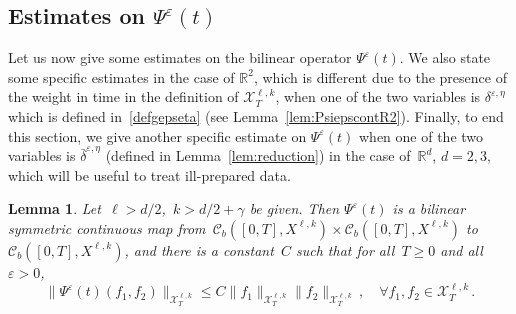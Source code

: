 \documentclass[11pt]{article}
\newtheorem{lemm}[theo]{Lemma}
\theoremstyle{definition}
\numberwithin{equation}{section}
\numberwithin{figure}{section}
\numberwithin{table}{section}
\newcommand*\R {\mathbb{R}}
\newcommand*\eps{{\varepsilon}}
\let\oldforall\forall
\renewcommand*{\forall}{\mathrel{\oldforall}}
\begin{document}
\subsection{Estimates on \texorpdfstring{$\Psi^\eps(t)$}{Psi eps(t)}}
Let us now give some estimates on the bilinear operator $\Psi^\eps(t)$. We also state some specific estimates in the case of $\R^2$, which is different due to the presence of the weight in time in the definition of $\mathcal{X}^{\ell,k}_T$, when one of the two variables is $\delta^{\eps,\eta}$ which is defined in~\eqref{defgepseta} (see Lemma~\ref{lem:PsiepscontR2}). Finally, to end this section, we give another specific estimate on $\Psi^\eps(t)$ when one of the two variables is $\bar \delta^{\eps,\eta}$ (defined in Lemma~\ref{lem:reduction}) in the case of~$\R^d$, $d=2,3$, which will be useful to treat ill-prepared data.

\begin{lemm}\label{lem:Psiepscont}
Let~$\ell>d/2$,~${k>d/2+\gamma}$ be given. Then $\Psi^\eps(t) $ is a bilinear symmetric continuous map from~$\mathcal{C}_b ([0,T], X^{\ell,k}) \times \mathcal{C}_b ([0,T], X^{\ell,k})$ to~$\mathcal{C}_b ([0,T], X^{\ell,k})$, and there is a constant~$C$ such that for all~$T\geq 0$ and all~$\eps>0$,
\begin{equation}\label{contest}
\|\Psi^\eps(t)(f_1,f_2)\|_{\mathcal{X}^{\ell,k}_T} \leq C \| f_1 \|_{\mathcal{X}^{\ell,k}_T} \| f_2 \|_{\mathcal{X}^{\ell,k}_T} \,, \quad \forall f_1, f_2 \in \mathcal{X}^{\ell,k}_T\,.
\end{equation}
\end{lemm}
\end{document}
